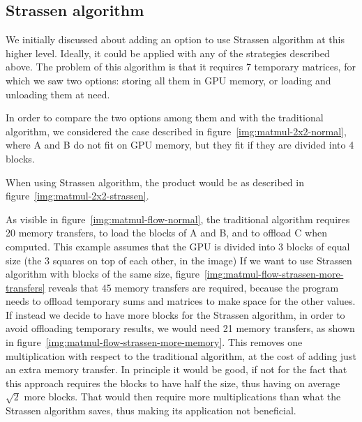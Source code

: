 
\subsection{Strassen algorithm}

We initially discussed about adding an option to use Strassen algorithm at this higher level.
Ideally, it could be applied with any of the strategies described above.
The problem of this algorithm is that it requires 7 temporary matrices, for which we saw two options: storing all them in GPU memory, or loading and unloading them at need.

In order to compare the two options among them and with the traditional algorithm, we considered the case described in figure~\ref{img:matmul-2x2-normal}, where A and B do not fit on GPU memory, but they fit if they are divided into 4 blocks.

When using Strassen algorithm, the product would be as described in figure~\ref{img:matmul-2x2-strassen}.


As visible in figure~\ref{img:matmul-flow-normal}, the traditional algorithm requires 20 memory transfers, to load the blocks of A and B, and to offload C when computed.
This example assumes that the GPU is divided into 3 blocks of equal size (the 3 squares on top of each other, in the image)
If we want to use Strassen algorithm with blocks of the same size, figure~\ref{img:matmul-flow-strassen-more-transfers} reveals that 45 memory transfers are required, because the program needs to offload temporary sums and matrices to make space for the other values.
If instead we decide to have more blocks for the Strassen algorithm, in order to avoid offloading temporary results, we would need 21 memory transfers, as shown in figure~\ref{img:matmul-flow-strassen-more-memory}.
This removes one multiplication with respect to the traditional algorithm, at the cost of adding just an extra memory transfer.
In principle it would be good, if not for the fact that this approach requires the blocks to have half the size, thus having on average $\sqrt{2}$ more blocks.
That would then require more multiplications than what the Strassen algorithm saves, thus making its application not beneficial.

